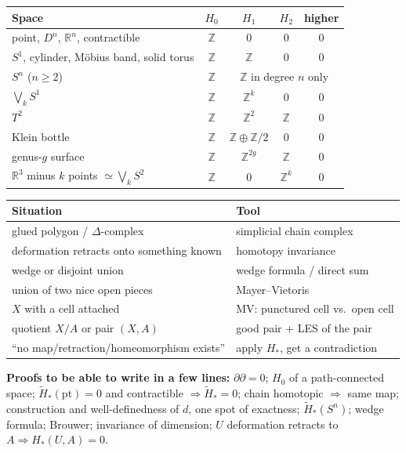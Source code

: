 \documentclass[11pt]{article}
\newcommand{\Z}{\mathbb Z}
\newcommand{\R}{\mathbb R}
\newcommand{\Hred}{\tilde H}
\theoremstyle{definition}
\begin{document}
\begin{center}
\renewcommand{\arraystretch}{1.25}
\begin{tabular}{lcccc}
\toprule
Space & $H_0$ & $H_1$ & $H_2$ & higher\\
\midrule
point, $D^n$, $\R^n$, contractible & $\Z$ & $0$ & $0$ & $0$\\
$S^1$, cylinder, Möbius band, solid torus & $\Z$ & $\Z$ & $0$ & $0$\\
$S^n$ ($n\ge2$) & $\Z$ & \multicolumn{3}{c}{$\Z$ in degree $n$ only}\\
$\bigvee_kS^1$ & $\Z$ & $\Z^k$ & $0$ & $0$\\
$T^2$ & $\Z$ & $\Z^2$ & $\Z$ & $0$\\
Klein bottle & $\Z$ & $\Z\oplus\Z/2$ & $0$ & $0$\\
genus-$g$ surface & $\Z$ & $\Z^{2g}$ & $\Z$ & $0$\\
$\R^3$ minus $k$ points $\simeq\bigvee_kS^2$ & $\Z$ & $0$ & $\Z^k$ & $0$\\
\bottomrule
\end{tabular}
\end{center}

\begin{center}
\renewcommand{\arraystretch}{1.25}
\begin{tabular}{ll}
\toprule
Situation & Tool\\
\midrule
glued polygon / $\Delta$-complex & simplicial chain complex\\
deformation retracts onto something known & homotopy invariance\\
wedge or disjoint union & wedge formula / direct sum\\
union of two nice open pieces & Mayer--Vietoris\\
$X$ with a cell attached & MV: punctured cell vs.\ open cell\\
quotient $X/A$ or pair $(X,A)$ & good pair + LES of the pair\\
``no map/retraction/homeomorphism exists'' & apply $H_*$, get a contradiction\\
\bottomrule
\end{tabular}
\end{center}

\textbf{Proofs to be able to write in a few lines:} $\partial\partial=0$; $H_0$ of a path-connected space; $\Hred_*(\mathrm{pt})=0$ and contractible $\Rightarrow\Hred_*=0$; chain homotopic $\Rightarrow$ same map; construction and well-definedness of $d$, one spot of exactness; $\Hred_*(S^n)$; wedge formula; Brouwer; invariance of dimension; $U$ deformation retracts to $A\Rightarrow H_*(U,A)=0$.
\end{document}
